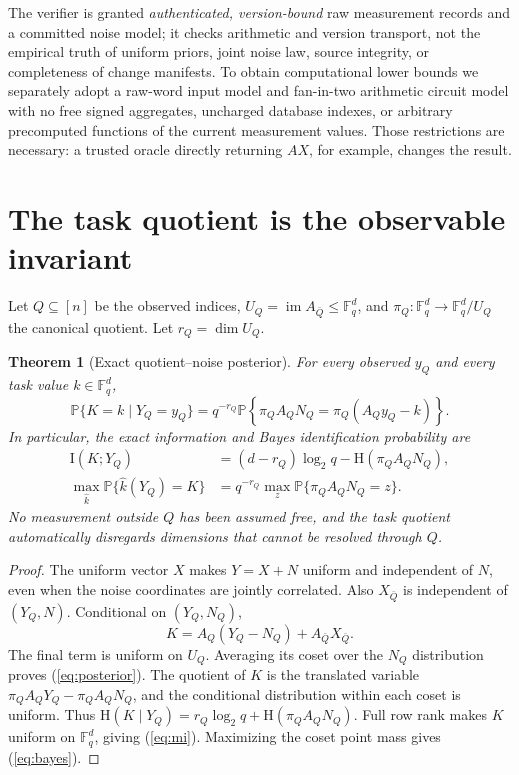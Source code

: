 \documentclass[11pt,letterpaper]{article}
\newtheorem{theorem}{Theorem}
\newcommand{\F}{\mathbb F}
\newcommand{\Hh}{\mathrm H}
\newcommand{\II}{\mathrm I}
\newcommand{\im}{\operatorname{im}}
\newcommand{\Prb}{\mathbb P}
\begin{document}
The verifier is granted \emph{authenticated, version-bound} raw measurement records and a committed noise model; it checks arithmetic and version transport, not the empirical truth of uniform priors, joint noise law, source integrity, or completeness of change manifests. To obtain computational lower bounds we separately adopt a raw-word input model and fan-in-two arithmetic circuit model with no free signed aggregates, uncharged database indexes, or arbitrary precomputed functions of the current measurement values. Those restrictions are necessary: a trusted oracle directly returning \(AX\), for example, changes the result.

\section{The task quotient is the observable invariant}
Let \(Q\subseteq[n]\) be the observed indices, \(U_Q=\im A_{\bar Q}\leq\F_q^d\), and \(\pi_Q:\F_q^d\to\F_q^d/U_Q\) the canonical quotient. Let \(r_Q=\dim U_Q\).

\begin{theorem}[Exact quotient--noise posterior]\label{thm:quotient}
For every observed \(y_Q\) and every task value \(k\in\F_q^d\),
\begin{equation}\label{eq:posterior}
\Prb\{K=k\mid Y_Q=y_Q\}
= q^{-r_Q}\Prb\!\left\{\pi_Q A_QN_Q=\pi_Q(A_Qy_Q-k)\right\}.
\end{equation}
In particular, the exact information and Bayes identification probability are
\begin{align}
\II(K;Y_Q)&=(d-r_Q)\log_2q-\Hh(\pi_Q A_QN_Q),\label{eq:mi}\\
\max_{\hat k}\Prb\{\hat k(Y_Q)=K\}
&=q^{-r_Q}\max_z\Prb\{\pi_Q A_QN_Q=z\}.\label{eq:bayes}
\end{align}
No measurement outside \(Q\) has been assumed free, and the task quotient automatically disregards dimensions that cannot be resolved through \(Q\).
\end{theorem}

\begin{proof}
The uniform vector \(X\) makes \(Y=X+N\) uniform and independent of \(N\), even when the noise coordinates are jointly correlated. Also \(X_{\bar Q}\) is independent of \((Y_Q,N)\). Conditional on \((Y_Q,N_Q)\),
\[K=A_Q(Y_Q-N_Q)+A_{\bar Q}X_{\bar Q}.\]
The final term is uniform on \(U_Q\). Averaging its coset over the \(N_Q\) distribution proves (\ref{eq:posterior}). The quotient of \(K\) is the translated variable \(\pi_Q A_Q Y_Q-\pi_Q A_QN_Q\), and the conditional distribution within each coset is uniform. Thus \(\Hh(K\mid Y_Q)=r_Q\log_2 q+\Hh(\pi_Q A_QN_Q)\). Full row rank makes \(K\) uniform on \(\F_q^d\), giving (\ref{eq:mi}). Maximizing the coset point mass gives (\ref{eq:bayes}).
\end{proof}
\end{document}
